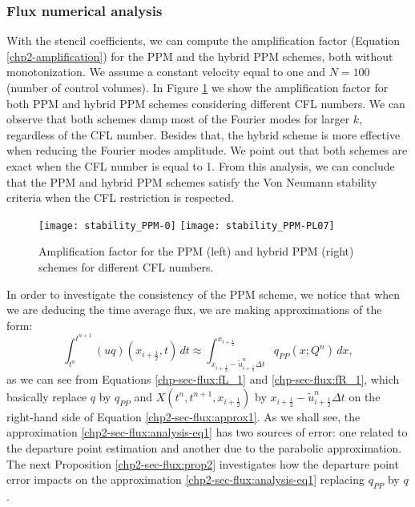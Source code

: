 \subsubsection{Flux numerical analysis}
With the stencil coefficients, we can compute the amplification factor 
(Equation \eqref{chp2-amplification}) for the PPM and the hybrid PPM schemes, both without monotonization.
We assume a constant velocity equal to one and $N=100$ (number of control volumes).
In Figure \ref{chp2-fig-amplification} we show the amplification factor for both PPM and hybrid PPM schemes
considering different CFL numbers.
We can observe that both schemes damp most of the Fourier modes for larger $k$, regardless of the CFL number.
Besides that, the hybrid scheme is more effective when reducing the Fourier modes amplitude.
We point out that both schemes are exact when the CFL number is equal to 1.
From this analysis, we can conclude that the PPM and hybrid PPM schemes satisfy the
Von Neumann stability criteria when the CFL restriction is respected.
\begin{figure}[ht]
	\centering
	\texttt{[image: stability\_PPM-0]}
	\texttt{[image: stability\_PPM-PL07]}
	\caption{Amplification factor for the PPM (left) and hybrid PPM (right) schemes for different CFL numbers.}
	\label{chp2-fig-amplification}
\end{figure}
In order to investigate the consistency of the PPM scheme, we notice that when we are deducing the time average flux, 
we are making approximations of the form:
\begin{equation}
	\label{chp2-sec-flux:analysis-eq1}
	\int_{t^n}^{t^{n+1}} (uq)(x_{i+\frac{1}{2}},t) \,dt \approx
	\int_{x_{i+\frac{1}{2}}-\tilde{u}_{i+\frac{1}{2}}^n \Delta t}^{x_{i+\frac{1}{2}}}
	q_{PP}(x;Q^n)\,dx, 
\end{equation}
as we can see from Equations \eqref{chp-sec-flux:fL_1} and \eqref{chp-sec-flux:fR_1},
which basically replace $q$ by $q_{PP}$ and $X(t^n, t^{n+1},x_{i+\frac{1}{2}})$ by 
$x_{i+\frac{1}{2}}-\tilde{u}_{i+\frac{1}{2}}^n \Delta t$
on the right-hand side of Equation \eqref{chp2-sec-flux:approx1}.
As we shall see, the approximation \eqref{chp2-sec-flux:analysis-eq1}
has two sources of error: one related to the departure point estimation and another due to the
parabolic approximation.
The next Proposition \eqref{chp2-sec-flux:prop2} investigates how the departure point error
impacts on the approximation \eqref{chp2-sec-flux:analysis-eq1} replacing $q_{PP}$ by $q$.

